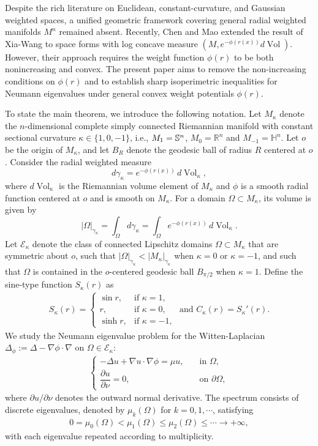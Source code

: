 \documentclass[11pt,leqno]{amsart}
\def\k{\kappa}
\def\p{\partial}
\def\S{\Bbb S}
\def\R{\mathbb{R}}
\def\k{\kappa}
\def\H{\mathbb{H}}
\def \p {\partial}
\def\V{\operatorname{Vol}}
\numberwithin{equation}{section}
\begin{document}
Despite the rich literature on Euclidean, constant-curvature, and Gaussian weighted spaces, a unified geometric framework covering general radial weighted manifolds $M^n$ remained absent. Recently,  Chen and Mao \cite{CM24} extended the result of Xia-Wang \cite{XW23} to space forms with log concave measure $(M,e^{-\phi(r(x))}d\V)$. However, their approach requires the weight function  $\phi(r)$ to be both nonincreasing and convex.  The present paper aims to remove the non-increasing conditions on $\phi(r)$ and to establish sharp isoperimetric inequalities for Neumann eigenvalues under general convex weight potentials $\phi(r)$. 

To state the main theorem, we introduce the following notation.  Let $M_\k$ denote the  $n$-dimensional complete simply connected Riemannian manifold  with constant sectional curvature $\kappa\in \{1,0,-1\}$, i.e., $M_1=\S^n$, $M_{0}=\R^n$ and $M_{-1}=\H^n$. Let $o$ be the origin of $M_\k$, and let $B_R$ denote the geodesic ball of radius $R$ centered at  $o$. Consider the radial weighted measure
$$
d\gamma_\k=e^{-\phi(r(x))}\, d\V_\k,
$$
where  $d\V_\k$  is the Riemannian volume element of $M_\k$  and $\phi$ is a smooth radial function centered at  $o$ and is smooth on $M_\k$. For a domain $\Omega\subset M_\k$, its volume is given by 
$$
|\Omega|_{\gamma_\k}=\int_\Omega d\gamma_\k=\int_\Omega e^{-\phi(r(x))}\, d\V_\k.
$$
Let $\mathcal{E}_\k$ denote the class of connected Lipschitz domains $\Omega\subset M_\k$  that are symmetric about $o$, such that $|\Omega|_{\gamma_\k}< |M_\k|_{\gamma_\k}$ when $\k=0$ or $\k=-1$, and such that $\Omega$ is contained in the $o$-centered geodesic ball $B_{\pi/2}$ when $\k=1$. Define the sine-type function $S_\k(r)$ as
\begin{align*}
    S_\kappa(r) =
\begin{cases}
\sin r, & \text{if } \kappa=1,\\
r, & \text{if } \kappa=0,\\
\sinh r, & \text{if } \kappa=-1,
\end{cases}\text{ and  $C_\kappa(r) = S_\kappa'(r)$.}
\end{align*}
We study the Neumann eigenvalue problem for the Witten-Laplacian  $\Delta_\phi:=\Delta-\nabla \phi \cdot \nabla$ on  $\Omega\in \mathcal{E}_\k$:
\begin{align}\label{1.2}
    \begin{cases}
        -\Delta u+\nabla u \cdot \nabla \phi=\mu u, &\quad \text{in $\Omega$},\\
        \dfrac{\p u}{\p \nu}=0, &\quad \text{on $\p \Omega$},
    \end{cases}
\end{align}
where $\p u/\p \nu$ denotes the outward normal derivative. The spectrum consists of discrete eigenvalues, denoted by $\mu_k(\Omega)$ for $k=0,1,\cdots$, satisfying
  \begin{align*}
       0=\mu_0(\Omega) < \mu_1(\Omega) \leq \mu_2(\Omega) \leq \cdots \to +\infty,
    \end{align*}
with each eigenvalue repeated according to multiplicity.
\end{document}

